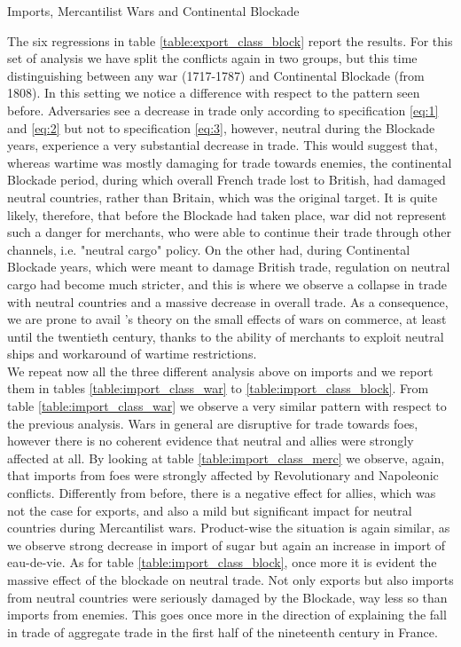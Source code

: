 \documentclass[12pt,a4paper,notitlepage,english]{article}
\begin{document}
\begin{table}
\begin{center}
\caption {Imports, Mercantilist Wars and Continental Blockade} 
\label{table:import_class_block}
\renewcommand{\arraystretch}{0.6}

\end{center}
\end{table}
The six regressions in table \ref{table:export_class_block} report the results. For this set of analysis we have split the conflicts again in two groups, but this time distinguishing between any war (1717-1787) and Continental Blockade (from 1808). In this setting we notice a difference with respect to the pattern seen before. Adversaries see a decrease in trade only according to specification \ref{eq:1} and \ref{eq:2} but not to specification \ref{eq:3}, however, neutral during the Blockade years, experience a very substantial decrease in trade. This would suggest that, whereas wartime was mostly damaging for trade towards enemies, the continental Blockade period, during which overall French trade lost to British, had damaged neutral countries, rather than Britain, which was the original target. It is quite likely, therefore, that before the Blockade had taken place, war did not represent such a danger for merchants, who were able to continue their trade through other channels, i.e. "neutral cargo" policy. On the other had, during Continental Blockade years, which were meant to damage British trade, regulation on neutral cargo had become much stricter, and this is where we observe a collapse in trade with neutral countries and a massive decrease in overall trade. As a consequence, we are prone to avail \cite{riley_seven_1986}'s theory on the small effects of wars on commerce, at least until the twentieth century, thanks to the ability of merchants to exploit neutral ships and workaround of wartime restrictions.\\
We repeat now all the three different analysis above on imports and we report them in tables \ref{table:import_class_war} to \ref{table:import_class_block}. From table \ref{table:import_class_war} we observe a very similar pattern with respect to the previous analysis. Wars in general are disruptive for trade towards foes, however there is no coherent evidence that neutral and allies were strongly affected at all. By looking at table \ref{table:import_class_merc} we observe, again, that imports from foes were strongly affected by Revolutionary and Napoleonic conflicts. Differently from before, there is a negative effect for allies, which was not the case for exports, and also a mild but significant impact for neutral countries during Mercantilist wars. Product-wise the situation is again similar, as we observe strong decrease in import of sugar but again an increase in import of eau-de-vie. As for table \ref{table:import_class_block}, once more it is evident the massive effect of the blockade on neutral trade. Not only exports but also imports from neutral countries were seriously damaged by the Blockade, way less so than imports from enemies. This goes once more in the direction of explaining the fall in trade of aggregate trade in the first half of the nineteenth century in France. \\
\end{document}
